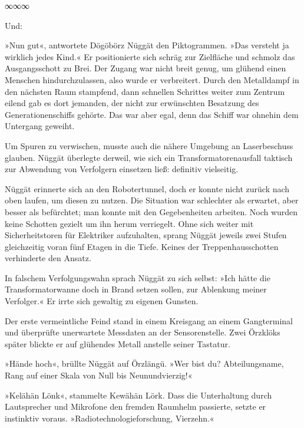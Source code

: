 \begin{center}
∞∞∞
\end{center}

 Und: 

»Nun gut«, antwortete Dögöbörz Nüggät den Piktogrammen. »Das versteht ja wirklich jedes Kind.« Er positionierte sich schräg zur Zielfläche und schmolz das Ausgangsschott zu Brei. Der Zugang war nicht breit genug, um glühend einen Menschen hindurchzulassen, also wurde er verbreitert. Durch den Metalldampf in den nächsten Raum stampfend, dann schnellen Schrittes weiter zum Zentrum eilend gab es dort jemanden, der nicht zur erwünschten Besatzung des Generationenschiffs gehörte. Das war aber egal, denn das Schiff war ohnehin dem Untergang geweiht.

Um Spuren zu verwischen, musste auch die nähere Umgebung an Laserbeschuss glauben. Nüggät überlegte derweil, wie sich ein Transformatorenausfall taktisch zur Abwendung von Verfolgern einsetzen ließ: definitiv vielseitig.

Nüggät erinnerte sich an den Robotertunnel, doch er konnte nicht zurück nach oben laufen, um diesen zu nutzen. Die Situation war schlechter als erwartet, aber besser als befürchtet; man konnte mit den Gegebenheiten arbeiten. Noch wurden keine Schotten gezielt um ihn herum verriegelt. Ohne sich weiter mit Sicherheitstoren für Elektriker aufzuhalten, sprang Nüggät jeweils zwei Stufen gleichzeitig voran fünf Etagen in die Tiefe. Keines der Treppenhausschotten verhinderte den Ansatz.

In falschem Verfolgungswahn sprach Nüggät zu sich selbst: »Ich hätte die Transformatorwanne doch in Brand setzen sollen, zur Ablenkung meiner Verfolger.« Er irrte sich gewaltig zu eigenen Gunsten.

Der erste vermeintliche Feind stand in einem Kreisgang an einem Gangterminal und überprüfte unerwartete Messdaten an der Sensorenstelle. Zwei Örzklöks später blickte er auf glühendes Metall anstelle seiner Tastatur.

»Hände hoch«, brüllte Nüggät auf Örzlängü. »Wer bist du? Abteilungsname, Rang auf einer Skala von Null bis Neunundvierzig!«

»Kelähän Lönk«, stammelte Kewähän Lörk. Dass die Unterhaltung durch Lautsprecher und Mikrofone den fremden Raumhelm passierte, setzte er instinktiv voraus. »Radiotechnologieforschung, Vierzehn.«

